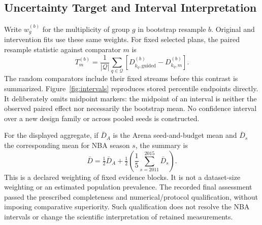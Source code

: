 \documentclass{article}
\begin{document}
\subsection{Uncertainty Target and Interval Interpretation}
Write $w_g^{(b)}$ for the multiplicity of group $g$ in bootstrap resample $b$. Original and intervention fits use these same weights. For fixed selected plans, the paired resample statistic against comparator $m$ is
\begin{equation}
 T_m^{(b)}=\frac{1}{|\mathcal Q|}\sum_{q\in\mathcal Q}
       \left[D_{k_q,\mathrm{guided}}^{(b)}-D_{k_q,m}^{(b)}\right].
\end{equation}
The random comparators include their fixed streams before this contrast is summarized. Figure~\ref{fig:intervals} reproduces stored percentile endpoints directly. It deliberately omits midpoint markers: the midpoint of an interval is neither the observed paired effect nor necessarily the bootstrap mean. No confidence interval over a new design family or across pooled seeds is constructed.

For the displayed aggregate, if $\bar D_A$ is the Arena seed-and-budget mean and $\bar D_s$ the corresponding mean for NBA season $s$, the summary is
\begin{equation}
 \bar D=\tfrac12\bar D_A+\tfrac12\left(\frac{1}{5}\sum_{s=2011}^{2015}\bar D_s\right).
\end{equation}
This is a declared weighting of fixed evidence blocks. It is not a dataset-size weighting or an estimated population prevalence. The recorded final assessment passed the prescribed completeness and numerical/protocol qualification, without imposing comparative superiority. Such qualification does not resolve the NBA intervals or change the scientific interpretation of retained measurements.
\end{document}
